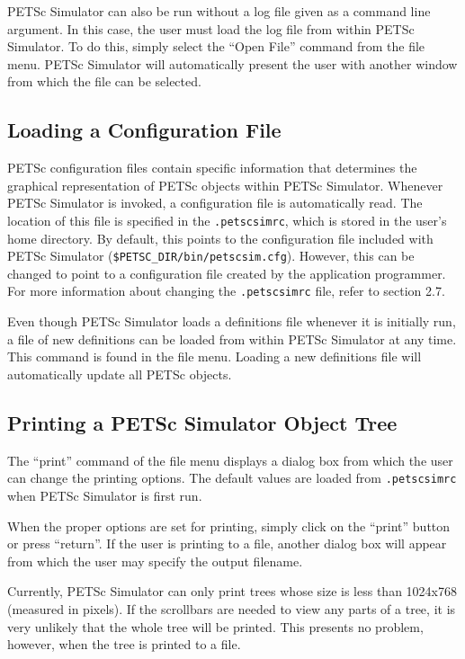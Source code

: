 PETSc Simulator can also be run without a log file given as a command
line argument.  In this case, the user must load the log file from
within PETSc Simulator.  To do this, simply select the ``Open File''
command from the file menu.  PETSc Simulator will automatically
present the user with another window from which the file can be
selected.

\subsection{Loading a Configuration File}

PETSc configuration files contain specific information that
determines the graphical representation of PETSc objects within PETSc
Simulator.  Whenever PETSc Simulator is invoked, a configuration file
is automatically read.  The location of this file is specified in the
{\tt .petscsimrc}, which is stored in the user's home directory.  By
default, this points to the configuration file included with PETSc
Simulator ({\tt \$PETSC\_DIR/bin/petscsim.cfg}).  However, this can be
changed to point to a configuration file created by the application
programmer.  For more information about changing the {\tt .petscsimrc}
file, refer to section 2.7.

Even though PETSc Simulator loads a definitions file whenever it is
initially run, a file of new definitions can be loaded from within PETSc
Simulator at any time.  This command is found in the file menu.
Loading a new definitions file will automatically update all PETSc
objects.

\subsection{Printing a PETSc Simulator Object Tree}

The ``print'' command of the file menu displays a dialog box from which
the user can change the printing options.  The default values are
loaded from {\tt .petscsimrc} when PETSc Simulator is first run.

When the proper options are set for printing, simply click on the
``print'' button or press ``return''.  If the user is printing to a file,
another dialog box will appear from which the user may specify the
output filename.

\begin{note}
Currently, PETSc Simulator can only print trees whose size is less
than 1024x768 (measured in pixels).  If the scrollbars are needed to
view any parts of a tree, it is very unlikely that the whole tree will
be printed.  This presents no problem, however, when the tree is
printed to a file.
\end{note}

